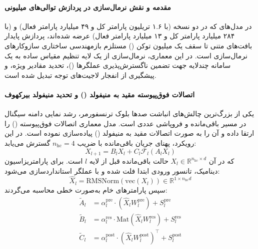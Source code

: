 \item {}

\paragraph*{مقدمه و نقش نرمال‌سازی در پردازش توالی‌های میلیونی}
در مدل‌های  \cite{deepseek2026v4} که در دو نسخه  (با ۱.۶ تریلیون پارامتر کل و ۴۹ میلیارد پارامتر فعال) و  (با ۲۸۴ میلیارد پارامتر کل و ۱۳ میلیارد پارامتر فعال) عرضه شده‌اند، پردازش پایدار بافت‌های متنی تا سقف یک میلیون توکن () مستلزم بازمهندسی ساختاری سازوکارهای نرمال‌سازی است. در این معماری، نرمال‌سازی از یک لایه تنظیم مقیاس ساده به یک سامانه چندلایه جهت تضمین ناگسترش‌پذیری عملگرها ()، تحدید مقادیر ویژه، و پیشگیری از انفجار لاجیت‌های توجه تبدیل شده است.

\paragraph*{اتصالات فوق‌پیوسته مقید به منیفولد () و تحدید منیفولد بیرکهوف}
یکی از بزرگ‌ترین چالش‌های انباشت صدها بلوک ترنسفورمر، رشد نمایی دامنه سیگنال در مسیر باقی‌مانده و فروپاشی عددی است. مدل  معماری اتصالات فوق‌پیوسته () را ارتقا داده و آن را به صورت اتصالات مقید به منیفولد () پیاده‌سازی نموده است. در این رویکرد، پهنای جریان باقی‌مانده با ضریب $n_{\text{hc}} = 4$ گسترش می‌یابد:
\begin{equation}
    X_{l+1} = B_l X_l + C_l \mathcal{F}_l(A_l X_l)
\end{equation}
که در آن $X_l \in \mathbb{R}^{n_{\text{hc}} \times d}$ حالت باقی‌مانده قبل از لایه $l$ است. برای پارامتریزاسیون دینامیک، تانسور ورودی ابتدا فلت شده و با عملگر  استانداردسازی می‌شود:
\begin{equation}
    \hat{X}_l = \text{RMSNorm}(\text{vec}(X_l)) \in \mathbb{R}^{1 \times n_{\text{hc}} d}
\end{equation}
سپس پارامترهای خام به‌صورت خطی محاسبه می‌گردند:
\begin{align}
    \tilde{A}_l &= \alpha_l^{\text{pre}} \cdot (\hat{X}_l W_l^{\text{pre}}) + S_l^{\text{pre}} \\
    \tilde{B}_l &= \alpha_l^{\text{res}} \cdot \text{Mat}(\hat{X}_l W_l^{\text{res}}) + S_l^{\text{res}} \\
    \tilde{C}_l &= \alpha_l^{\text{post}} \cdot (\hat{X}_l W_l^{\text{post}})^\top + S_l^{\text{post}}
\end{align}

